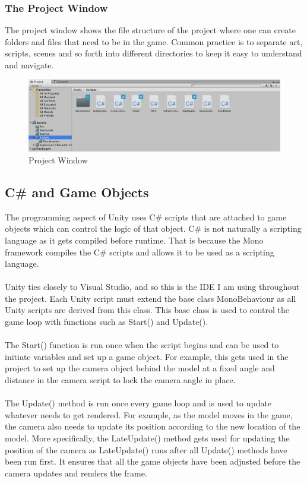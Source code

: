\documentclass[a4paper]{report}
\begin{document}
\subsubsection{The Project Window}
The project window shows the file structure of the project where one can create folders and files that need to be in the game. Common practice is to separate art, scripts, scenes and so forth into different directories to keep it easy to understand and navigate.
\begin{figure}[h]
\centering
\includegraphics[scale=0.55]{project}
\caption{Project Window}
\end{figure}
\subsection{C\# and Game Objects}
The programming aspect of Unity uses C\# scripts that are attached to game objects which can control the logic of that object. C\# is not naturally a scripting language as it gets compiled before runtime. That is because the Mono framework compiles the C\# scripts and allows it to be used as a scripting language. \cite{Mono}
\\\\
Unity ties closely to Visual Studio, and so this is the IDE I am using throughout the project. Each Unity script must extend the base class MonoBehaviour as all Unity scripts are derived from this class. This base class is used to control the game loop with functions such as Start() and Update().  
\\\\
The Start() function is run once when the script begins and can be used to initiate variables and set up a game object. For example, this gets used in the project to set up the camera object behind the model at a fixed angle and distance in the camera script to lock the camera angle in place.
\\\\
The Update() method is run once every game loop and is used to update whatever needs to get rendered. For example, as the model moves in the game, the camera also needs to update its position according to the new location of the model. More specifically, the LateUpdate() method gets used for updating the position of the camera as LateUpdate() runs after all Update() methods have been run first. It ensures that all the game objects have been adjusted before the camera updates and renders the frame. \cite{Unity}
\end{document}
